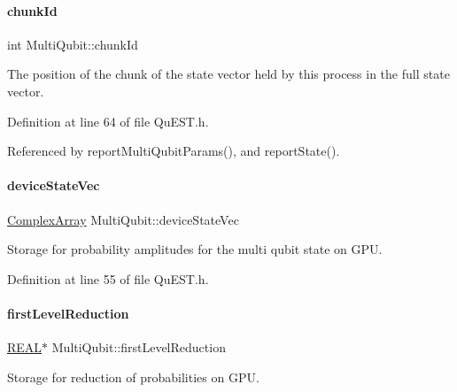 \paragraph{\texorpdfstring{chunk\+Id}{chunkId}}
{\footnotesize\ttfamily int Multi\+Qubit\+::chunk\+Id}



The position of the chunk of the state vector held by this process in the full state vector. 



Definition at line 64 of file Qu\+E\+S\+T.\+h.



Referenced by report\+Multi\+Qubit\+Params(), and report\+State().

\mbox{\label{structMultiQubit_a59ac613486a41b8c9a4b6e79cc8d2cc3}} 
\paragraph{\texorpdfstring{device\+State\+Vec}{deviceStateVec}}
{\footnotesize\ttfamily \mbox{\hyperlink{structComplexArray}{Complex\+Array}} Multi\+Qubit\+::device\+State\+Vec}



Storage for probability amplitudes for the multi qubit state on G\+PU. 



Definition at line 55 of file Qu\+E\+S\+T.\+h.

\mbox{\label{structMultiQubit_a4e0088b41adab0a40b7a31e528ed42b5}} 
\paragraph{\texorpdfstring{first\+Level\+Reduction}{firstLevelReduction}}
{\footnotesize\ttfamily \mbox{\hyperlink{QuEST__precision_8h_a4b654506f18b8bfd61ad2a29a7e38c25}{R\+E\+AL}}$\ast$ Multi\+Qubit\+::first\+Level\+Reduction}



Storage for reduction of probabilities on G\+PU. 



